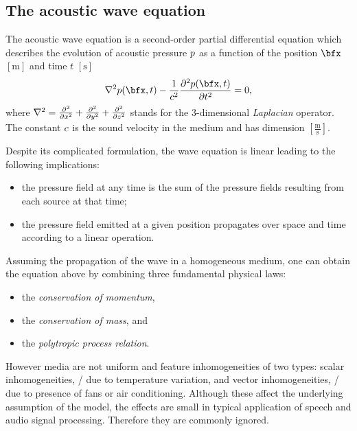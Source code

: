 \subsection{The acoustic wave equation}\label{subsec:acoustics:waveq}
The acoustic wave equation is a second-order partial differential equation which describes the evolution of acoustic pressure $\pressure$
as a function of the position $\positionMicrophone$ $[\si{\metre}]$ and time $t$ $[\si{\second}]$ 
\begin{equation}
    \label{eq:acoustics:wave}
    \knabla^2 \pressureSpaceTime - \frac{1}{\speedOfSound^2} \kpderiv[2]{\pressureSpaceTime}{t} = 0
    ,
\end{equation}
where $\knabla^2 = \kpderiv[2]{}{x} + \kpderiv[2]{}{y} + \kpderiv[2]{}{z}$ stands for the 3-dimensional \textit{Laplacian} operator.
The constant $\speedOfSound$ is the sound velocity in the medium and has dimension $[\frac{\si{\metre}}{\si{\second}}]$.

Despite its complicated formulation, the wave equation is linear leading to the following implications:
\begin{itemize}
    \item the pressure field at any time is the sum of the pressure fields resulting from each source at that time;
    \item the pressure field emitted at a given position propagates over space and time according to a linear operation.
\end{itemize}

Assuming the propagation of the wave in a homogeneous medium, one can obtain the equation above by combining three fundamental physical laws:
\begin{itemize}
    \item the \textit{conservation of momentum},
    \item the \textit{conservation of mass}, and
    \item the \textit{polytropic process relation}.
\end{itemize}
However media are not uniform and feature inhomogeneities of two types:
scalar inhomogeneities, \eg/ due to temperature variation,
and vector inhomogeneities, \eg/ due to presence of fans or air conditioning.
Although these affect the underlying assumption of the model, the effects are small in typical application of speech and audio signal processing.
Therefore they are commonly ignored.


